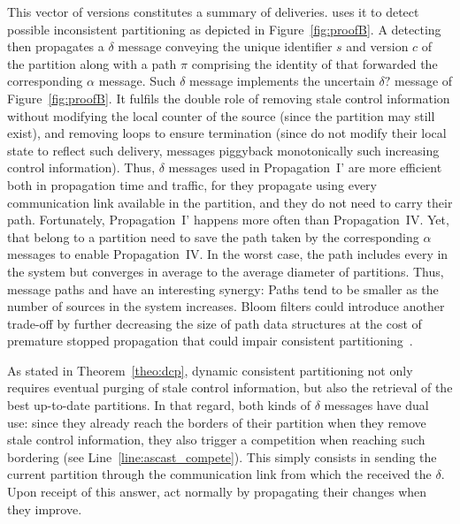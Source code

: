 This vector of versions constitutes a summary of deliveries. \NAME
uses it to detect possible inconsistent partitioning as depicted in
Figure~\ref{fig:proofB}. A detecting \process then propagates a
$\delta$ message conveying the unique identifier $s$ and version $c$
of the partition along with a path $\pi$ comprising the identity of
\processes that forwarded the corresponding $\alpha$ message. Such
$\delta$ message implements the uncertain $\delta?$ message of
Figure~\ref{fig:proofB}. It fulfils the double role of removing stale
control information without modifying the local counter of the source
(since the partition may still exist), and removing loops to ensure
termination (since \processes do not modify their local state to
reflect such delivery, messages piggyback monotonically such
increasing control information). Thus, $\delta$ messages used in
Propagation~I' are more efficient both in propagation time and
traffic, for they propagate using every communication link available
in the partition, and they do not need to carry their path.
Fortunately, Propagation~I' happens more often than Propagation~IV.
Yet, \processes that belong to a partition need to save the path taken
by the corresponding $\alpha$ messages to enable Propagation~IV.  In
the worst case, the path includes every \processes in the system but
converges in average to the average diameter of partitions. Thus,
message paths and \NAME have an interesting synergy: Paths tend to be
smaller as the number of sources in the system increases. Bloom
filters could introduce another trade-off by further decreasing the
size of path data structures at the cost of premature stopped
propagation that could impair consistent
partitioning~\cite{whitaker2002forwarding}.

As stated in Theorem~\ref{theo:dcp}, dynamic consistent partitioning
not only requires eventual purging of stale control information, but
also the retrieval of the best up-to-date partitions. In that regard,
both kinds of $\delta$ messages have dual use: since they already
reach the borders of their partition when they remove stale control
information, they also trigger a competition when reaching such
bordering \processes (see Line~\ref{line:ascast_compete}). This simply
consists in sending the current partition through the communication
link from which the \process received the $\delta$. Upon receipt of
this answer, \processes act normally by propagating their changes when
they improve.

